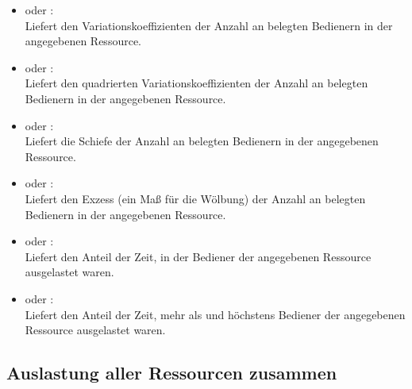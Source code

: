 \begin{itemize}
\item
{} oder :\\
Liefert den Variationskoeffizienten der Anzahl an belegten Bedienern in der angegebenen Ressource.

\item
{} oder :\\
Liefert den quadrierten Variationskoeffizienten der Anzahl an belegten Bedienern in der angegebenen Ressource.  

\item
{} oder :\\
Liefert die Schiefe der Anzahl an belegten Bedienern in der angegebenen Ressource.

\item
{} oder :\\
Liefert den Exzess (ein Maß für die Wölbung) der Anzahl an belegten Bedienern in der angegebenen Ressource.

\item
{} oder :\\
Liefert den Anteil der Zeit, in der  Bediener der angegebenen Ressource ausgelastet waren.

\item
{} oder :\\
Liefert den Anteil der Zeit, mehr als  und höchstens  Bediener der angegebenen Ressource ausgelastet waren.

\end{itemize}



\subsection{Auslastung aller Ressourcen zusammen}

